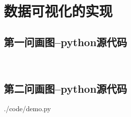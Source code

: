 \documentclass{whutmod}
\begin{document}
	\newpage
	\appendix %
	\section{数据可视化的实现}
		\subsection*{第一问画图--python源代码}
			\begin{lstlisting}[language=python]
			
			\end{lstlisting}
			
		\subsection*{第二问画图--python源代码}
			 {./code/demo.py}
\end{document}
